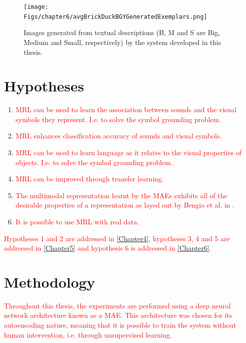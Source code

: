\begin{figure}
\centering

\texttt{[image: Figs/chapter6/avgBrickDuckBGYGeneratedExemplars.png]}
\caption{Images generated from textual descriptions (B, M and S are Big, Medium and Small, respectively) by the system developed in this thesis.}
\label{fig:mrl_teaser}
\end{figure}

\section{Hypotheses}


\begin{enumerate}

	\item \textcolor{red}{\ac{MRL} can be used to learn the association between sounds and the visual symbols they represent. I.e. to solve the symbol grounding problem.}
	\item \textcolor{red}{\ac{MRL} enhances classification accuracy of sounds and visual symbols.}
	\item \textcolor{red}{\ac{MRL} can be used to learn language as it relates to the visual properties of objects. I.e. to solve the symbol grounding problem.}
	\item \textcolor{red}{\ac{MRL} can be improved through transfer learning.}
	\item \textcolor{red}{The multimodal representation learnt by the \acp{MAE} exhibits all of the desirable properties of a representation as layed out by Bengio et al. in \cite{repRev}.}		
	\item \textcolor{red}{It is possible to use \ac{MRL} with real data.}
	
\end{enumerate}

\textcolor{red}{Hypotheses 1 and 2 are addressed in \autoref{Chapter4}, hypotheses 3, 4 and 5 are addressed in \autoref{Chapter5} and hypothesis 6 is addressed in \autoref{Chapter6}.} 


\section{Methodology}
\textcolor{red}{Throughout this thesis, the experiments are performed using a deep neural network architecture known as a \acl{MAE}. This architecture was chosen for its autoencoding nature, meaning that it is possible to train the system without human intervention, i.e. through unsupervised learning.} 

